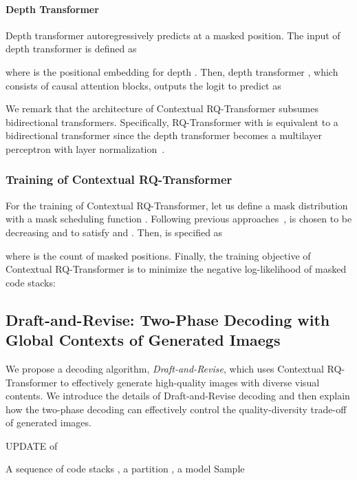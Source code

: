 \documentclass{article}
\newcommand{\ARmodel}{Contextual RQ-Transformer }
\begin{document}
\paragraph{Depth Transformer} 
Depth transformer autoregressively predicts  at a masked position. The input of depth transformer  is defined as 

where  is the positional embedding for depth .
Then, depth transformer , which consists of causal attention blocks, outputs the logit  to predict  as


We remark that the architecture of Contextual RQ-Transformer subsumes bidirectional transformers. Specifically, RQ-Transformer with  is equivalent to a bidirectional transformer since the depth transformer becomes a multilayer perceptron with layer normalization~\cite{layernorm}.


\subsubsection{Training of Contextual RQ-Transformer} \label{sec:training_part}
For the training of Contextual RQ-Transformer, let us define a mask distribution  with a mask scheduling function . Following previous approaches~\cite{MaskGIT,mask-predict,ShowMeWhat},  is chosen to be decreasing and to satisfy  and . Then,  is specified as

where  is the count of masked positions.
Finally, the training objective of \ARmodel is to minimize the negative log-likelihood of masked code stacks: 






\subsection{Draft-and-Revise: Two-Phase Decoding with Global Contexts of Generated Imaegs} 
\label{sec:draft_and_revise}

We propose a decoding algorithm, \emph{Draft-and-Revise}, which uses Contextual RQ-Transformer to effectively generate high-quality images with diverse visual contents. 
We introduce the details of Draft-and-Revise decoding and then explain how the two-phase decoding can effectively control the quality-diversity trade-off of generated images.


\begin{algorithm}[t]
\caption{\textsc{UPDATE} of }
\label{alg:UPDATE}
\begin{algorithmic}[1]
\Require A sequence of code stacks , a partition , a model 
\For{}
    \State Sample  \; 
\EndFor
\State \Return 
\end{algorithmic}
\end{algorithm}
\end{document}
